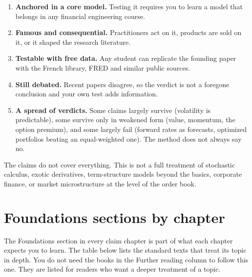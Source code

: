 \begin{enumerate}
  \item \textbf{Anchored in a core model.} Testing it requires you to learn a model that belongs in any financial engineering course.
  \item \textbf{Famous and consequential.} Practitioners act on it, products are sold on it, or it shaped the research literature.
  \item \textbf{Testable with free data.} Any student can replicate the founding paper with the French library, FRED and similar public sources.
  \item \textbf{Still debated.} Recent papers disagree, so the verdict is not a foregone conclusion and your own test adds information.
  \item \textbf{A spread of verdicts.} Some claims largely survive (volatility is predictable), some survive only in weakened form (value, momentum, the option premium), and some largely fail (forward rates as forecasts, optimized portfolios beating an equal-weighted one). The method does not always say no.
\end{enumerate}

The claims do not cover everything. This is not a full treatment of stochastic calculus, exotic derivatives, term-structure models beyond the basics, corporate finance, or market microstructure at the level of the order book. 

\section*{Foundations sections by chapter}

The Foundations section in every claim chapter is part of what each chapter expects you to learn. 
The table below lists the standard texts that treat its topic in depth. You do not need the books in the Further reading column to follow this one. They are listed for readers who want a deeper treatment of a topic.

